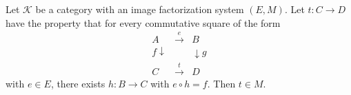 Let $\mathcal{K}$ be a category with an image factorization system $(E, M)$. Let $t: C \longrightarrow D$ have the property that for every commutative square of the form
$$
\begin{array}{ccc}
A & \xrightarrow{e} & B \\
{\scriptstyle f}\downarrow & & \downarrow{\scriptstyle g} \\
C & \xrightarrow{t} & D
\end{array}
$$
with $e \in E$, there exists $h: B \longrightarrow C$ with $e \circ h = f$. Then $t \in M$.
